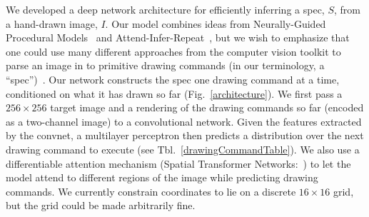 \documentclass{article}
\newcommand{\remark}[1]{\textcolor{red}{[#1]}}
\theoremstyle{definition}
\begin{document}
We developed a deep network architecture for efficiently inferring a
spec, $S$, from a hand-drawn image, $I$.
Our model combines ideas from
Neurally-Guided Procedural Models~\citep{ritchie2016neurally}
and Attend-Infer-Repeat~\citep{eslami1603attend}, but
we wish to emphasize
that one could use
many different approaches from the computer vision toolkit to
parse an image in to primitive drawing commands  (in our terminology, a ``spec'')~\cite{nsd}.
Our network constructs the
spec one drawing command at a time, conditioned on what it has drawn so far (Fig.~\ref{architecture}).
We first
pass a $256\times 256$ target image and a rendering of the drawing commands so
far (encoded as a two-channel image) to a convolutional network. Given
the features extracted by the convnet, a multilayer perceptron then
predicts a distribution over the next drawing command to execute
(see Tbl.~\ref{drawingCommandTable}).
We also use a
differentiable attention mechanism (Spatial Transformer
Networks:~\cite{jaderberg2015spatial}) to let the model attend to
different regions of the image while predicting drawing commands.
We currently constrain
coordinates to lie on a discrete $16\times 16$ grid,
but the grid could be made arbitrarily fine.  %
\end{document}

